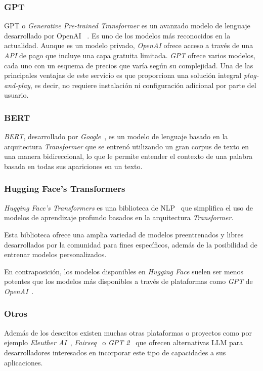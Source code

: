 \subsubsection{GPT}
GPT o \textit{Generative Pre-trained Transformer} es un avanzado modelo de lenguaje desarrollado por OpenAI
~\cite{article_brown_2020}.
Es uno de los modelos más reconocidos en la actualidad.
Aunque es un modelo privado, \textit{OpenAI} ofrece acceso a través de una \textit{API} de pago que incluye una capa
gratuita limitada.
\textit{GPT} ofrece varios modelos, cada uno con un esquema de precios que varía según su complejidad.
Una de las principales ventajas de este servicio es que proporciona una solución integral \textit{plug-and-play}, es
decir, no requiere instalación ni configuración adicional por parte del usuario.

\subsubsection{BERT}
\textit{BERT}, desarrollado por \textit{Google}~\cite{article_devlin_2019}, es un modelo de lenguaje basado en la
arquitectura \textit{Transformer} que se entrenó utilizando un gran corpus de texto en una manera bidireccional, lo
que le permite entender el contexto de una palabra basada en todas sus apariciones en un texto.

\subsubsection{Hugging Face's Transformers}

\textit{Hugging Face's Transformers} es una biblioteca de NLP~\cite{article_wolf_2020} que simplifica el uso de modelos
de aprendizaje profundo basados en la arquitectura \textit{Transformer}.

Esta biblioteca ofrece una amplia variedad de modelos preentrenados y libres desarrollados por la comunidad para fines
específicos, además de la posibilidad de entrenar modelos personalizados.

En contraposición, los modelos disponibles en \textit{Hugging Face}
suelen ser menos potentes que los modelos más disponibles a través de plataformas como \textit{GPT} de
\textit{OpenAI}~\cite{url_chatgpt_vs_huggingchat}.

\subsubsection{Otros}

Además de los descritos existen muchas otras plataformas o proyectos como por ejemplo
\textit{Eleuther AI}~\cite{url_eleutherai}, \textit{Fairseq}~\cite{url_fairseq} o \textit{GPT 2}~\cite{url_gpt2}
que ofrecen alternativas LLM para desarrolladores interesados en incorporar este tipo de capacidades a sus aplicaciones.
